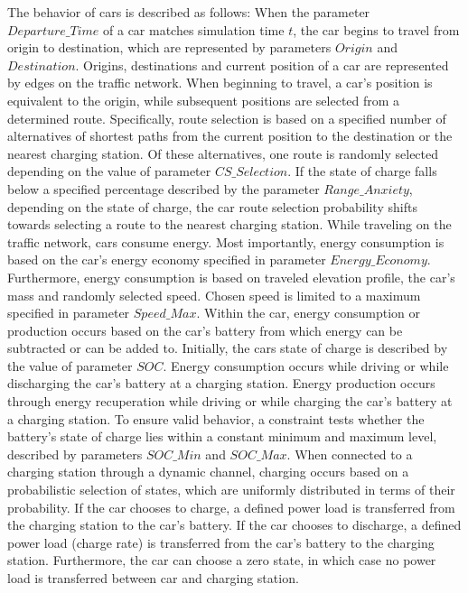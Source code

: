 The behavior of cars is described as follows: When the parameter $Departure\_Time$ of a car matches simulation time $t$, the car begins to travel from origin to destination, which are represented by parameters $Origin$ and $Destination$. Origins, destinations and current position of a car are represented by edges on the traffic network.  When beginning to travel, a car's position is equivalent to the origin, while subsequent positions are selected from a determined route. Specifically, route selection is based on a specified number of alternatives of shortest paths from the current position to the destination or the nearest charging station. Of these alternatives, one route is randomly selected depending on the value of parameter $CS\_Selection$. If the state of charge falls below a specified percentage described by the parameter $Range\_Anxiety$, depending on the state of charge, the car route selection probability shifts towards selecting a route to the nearest charging station. While traveling on the traffic network, cars consume energy. Most importantly, energy consumption is based on the car's energy economy specified in parameter $Energy\_Economy$. Furthermore, energy consumption is based on traveled elevation profile, the car's mass and randomly selected speed. Chosen speed is limited to a maximum specified in parameter $Speed\_Max$. Within the car, energy consumption or production occurs based on the car's battery from which energy can be subtracted or can be added to. Initially, the cars state of charge is described by the value of parameter $SOC$. Energy consumption occurs while driving or while discharging the car's battery at a charging station. Energy production occurs through energy recuperation while driving or while charging the car's battery at a charging station. To ensure valid behavior, a constraint tests whether the battery's state of charge lies within a constant minimum and maximum level, described by parameters $SOC\_Min$ and $SOC\_Max$. When connected to a charging station through a dynamic channel, charging occurs based on a probabilistic selection of states, which are uniformly distributed in terms of their probability. If the car chooses to charge, a defined power load is transferred from the charging station to the car's battery. If the car chooses to discharge, a defined power load (charge rate) is transferred from the car's battery to the charging station. Furthermore, the car can choose a zero state, in which case no power load is transferred between car and charging station.


